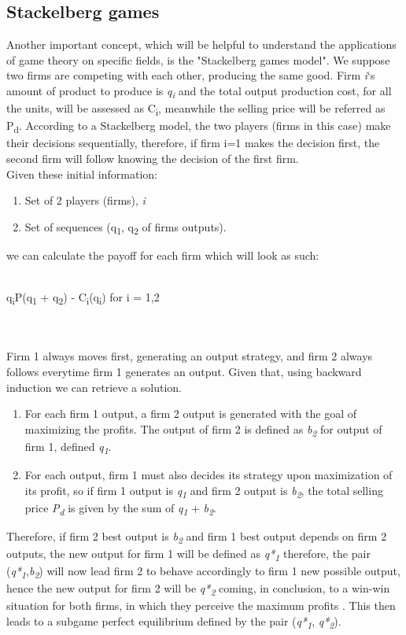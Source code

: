 \documentclass[conference]{IEEEtran}
\begin{document}
\subsection{Stackelberg games}
Another important concept, which will be helpful to understand the applications of game theory on specific fields, is the "Stackelberg games model".
We suppose two firms are competing with each other, producing the same good. Firm \textit{i}`s amount of product to produce is \textit{q\textsubscript{i}} and the total output production cost, for all the units, will be assessed as C\textsubscript{i}, meanwhile the selling price will be referred as P\textsubscript{d}. According to a Stackelberg model, the two players (firms in this case) make their decisions sequentially, therefore, if firm i=1 makes the decision first, the second firm will follow knowing the decision of the first firm.\\
Given these initial information:
\begin{enumerate}
\item Set of 2 players (firms), \textit{i}
\item Set of sequences (q\textsubscript{1}, q\textsubscript{2} of firms outputs).
\end{enumerate}

 we can calculate the payoff for each firm which will look as such:\\\\
\centerline{q\textsubscript{i}P(q\textsubscript{1} + q\textsubscript{2}) - C\textsubscript{i}(q\textsubscript{i}) for i = 1,2}\\\\
Firm 1 always moves first, generating an output strategy, and firm 2 always follows everytime firm 1 generates an output. Given that, using backward induction we can retrieve a solution.
\begin{enumerate}
\item For each firm 1 output, a firm 2 output is generated with the goal of maximizing the profits. The output of firm 2 is defined as \textit{b\textsubscript{2}} for output of firm 1, defined \textit{q\textsubscript{1}}.
\item For each output, firm 1 must also decides its strategy upon maximization of its profit, so if firm 1 output is \textit{q\textsubscript{1}} and firm 2 output is \textit{b\textsubscript{2}}, the total selling price \textit{P\textsubscript{d}} is given by the sum of \textit{q\textsubscript{1}} + \textit{b\textsubscript{2}}.
\end{enumerate}
Therefore, if firm 2 best output is \textit{b\textsubscript{2}} and firm 1 best output depends on firm 2 outputs, the new output for firm 1 will be defined as \textit{q*\textsubscript{1}}
therefore, the pair (\textit{q*\textsubscript{1}},\textit{b\textsubscript{2}}) will now lead firm 2 to behave accordingly to firm 1 new possible output, hence the new output for firm 2 will be \textit{q*\textsubscript{2}} coming, in conclusion, to a win-win situation for both firms, in which they perceive the maximum profits . This then leads to a subgame perfect equilibrium defined by the pair (\textit{q*\textsubscript{1}}, \textit{q*\textsubscript{2}}).\cite{b8}
\end{document}

